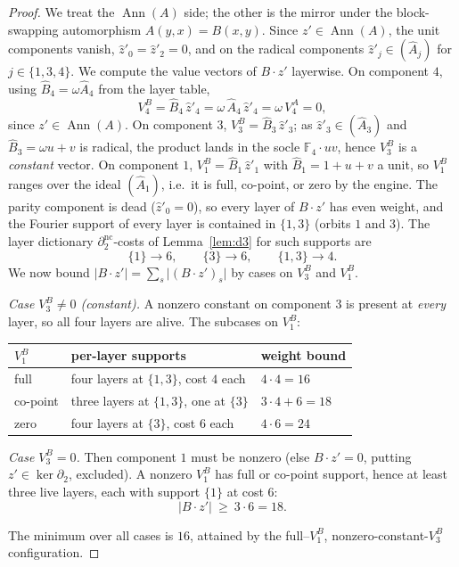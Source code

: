 \documentclass[11pt]{article}
\newcommand{\F}[1]{\mathbb{F}_{#1}}
\newcommand{\wt}[1]{\lvert #1\rvert}
\DeclareMathOperator{\Ann}{Ann}
\newcommand{\hA}{\hat{A}}
\newcommand{\hB}{\hat{B}}
\newcommand{\dncut}{\partial_2^{\mathrm{nc}}}   %
\theoremstyle{plain}
\theoremstyle{definition}
\theoremstyle{remark}
\begin{document}
\begin{proof}
We treat the $\Ann(A)$ side; the other is the mirror under the block-swapping
automorphism $A(y,x)=B(x,y)$. Since $z'\in\Ann(A)$, the unit components vanish,
$\hat z'_0=\hat z'_2=0$, and on the radical components $\hat z'_j\in(\hA_j)$ for
$j\in\{1,3,4\}$. We compute the value vectors of $B\cdot z'$ layerwise. On component $4$,
using $\hB_4=\omega\hA_4$ from the layer table,
\[
  V_4^B=\hB_4\,\hat z'_4=\omega\,\hA_4\,\hat z'_4=\omega\,V_4^A=0,
\]
since $z'\in\Ann(A)$. On component $3$, $V_3^B=\hB_3\,\hat z'_3$; as $\hat z'_3\in(\hA_3)$
and $\hB_3=\omega u+v$ is radical, the product lands in the socle $\F4\cdot uv$, hence
$V_3^B$ is a \emph{constant} vector. On component $1$, $V_1^B=\hB_1\,\hat z'_1$ with
$\hB_1=1+u+v$ a unit, so $V_1^B$ ranges over the ideal $(\hA_1)$, i.e.\ it is full,
co-point, or zero by the engine. The parity component is dead ($\hat z'_0=0$), so every
layer of $B\cdot z'$ has even weight, and the Fourier support of every layer is contained
in $\{1,3\}$ (orbits $1$ and $3$). The layer dictionary $\dncut$-costs of
Lemma~\ref{lem:d3} for such supports are
\[
  \{1\}\to 6,\qquad \{3\}\to 6,\qquad \{1,3\}\to 4.
\]
We now bound $\wt{B\cdot z'}=\sum_s\wt{(B\cdot z')_s}$ by cases on $V_3^B$ and $V_1^B$.

\smallskip
\noindent\emph{Case $V_3^B\ne 0$ (constant).} A nonzero constant on component $3$ is
present at \emph{every} layer, so all four layers are alive. The subcases on $V_1^B$:
\begin{center}
\renewcommand{\arraystretch}{1.2}
\begin{tabular}{lll}
\toprule
$V_1^B$ & per-layer supports & weight bound\\
\midrule
full      & four layers at $\{1,3\}$, cost $4$ each      & $4\cdot 4=16$\\
co-point  & three layers at $\{1,3\}$, one at $\{3\}$     & $3\cdot 4+6=18$\\
zero      & four layers at $\{3\}$, cost $6$ each         & $4\cdot 6=24$\\
\bottomrule
\end{tabular}
\end{center}

\smallskip
\noindent\emph{Case $V_3^B=0$.} Then component $1$ must be nonzero (else
$B\cdot z'=0$, putting $z'\in\ker\partial_2$, excluded). A nonzero $V_1^B$ has full or
co-point support, hence at least three live layers, each with support $\{1\}$ at cost $6$:
\[
  \wt{B\cdot z'}\ \ge\ 3\cdot 6=18.
\]

\smallskip
The minimum over all cases is $16$, attained by the full--$V_1^B$, nonzero-constant-$V_3^B$
configuration.
\end{proof}
\end{document}
